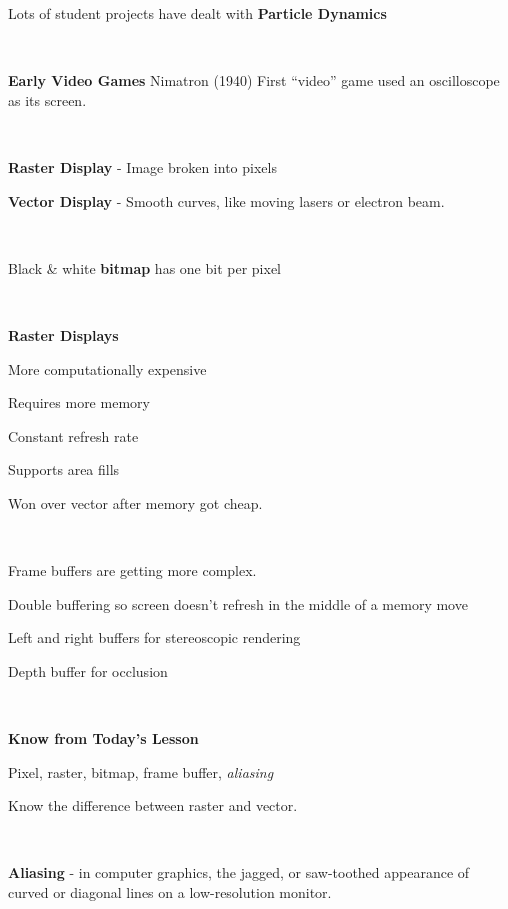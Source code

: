 Lots of student projects have dealt with {\bf Particle Dynamics}

\

{\bf Early Video Games}  Nimatron (1940)  First ``video'' game used an oscilloscope as its screen.  

\

{\bf Raster Display} - Image broken into pixels

{\bf Vector Display} - Smooth curves, like moving lasers or electron beam.  

\

Black \& white {\bf bitmap} has one bit per pixel

\

{\bf Raster Displays}

More computationally expensive

Requires more memory

Constant refresh rate

Supports area fills

Won over vector after memory got cheap.  

\

Frame buffers are getting more complex.  

\qquad Double buffering so screen doesn't refresh in the middle of a memory move

\qquad Left and right buffers for stereoscopic rendering

\qquad Depth buffer for occlusion

\

{\bf Know from Today's Lesson}

Pixel, raster, bitmap, frame buffer, {\it aliasing}

Know the difference between raster and vector.  

\

{\bf Aliasing} - in computer graphics, the jagged, or saw-toothed appearance of curved or diagonal lines on a low-resolution monitor.

